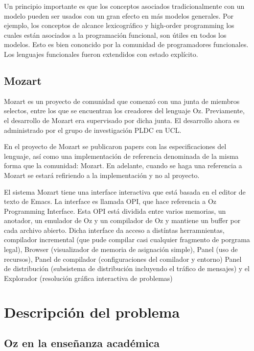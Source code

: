 \documentclass[a4paper,11pt]{article}
\begin{document}
Un principio importante es que los conceptos asociados tradicionalmente con un modelo pueden ser usados con un gran efecto en más modelos generales. Por ejemplo, los conceptos de alcance lexicográfico y high-order programming los cuales están asociados a la programación funcional, son útiles en todos los modelos. Esto es bien cononcido por la comunidad de programadores funcionales. Los lenguajes funcionales fueron extendidos con estado explícito.


\subsection{Mozart}

Mozart es un proyecto de comunidad que comenzó con una junta de miembros selectos, entre los que se encuentran los creadores del lenguaje Oz. Previamente, el desarrollo de Mozart era supervisado por dicha junta. El desarrollo ahora es administrado por el grupo de investigación PLDC en UCL.

En el proyecto de Mozart se publicaron papers con las especificaciones del lenguaje, así como una implementación de referencia denominada de la misma forma que la comunidad: Mozart. En adelante, cuando se haga una referencia a Mozart se estará refiriendo a la implementación y no al proyecto.

El sistema Mozart tiene una interface interactiva que está basada en el editor de texto de Emacs. La interface es llamada OPI, que hace referencia a Oz Programming Interface. Esta OPI está dividida entre varios memorias, un anotador, un emulador de Oz y un compilador de Oz y mantiene un buffer por cada archivo abierto. Dicha interface da acceso a distíntas herramnientas, compilador incremental (que pude compilar casi cualquier fragmento de porgrama legal), Browser (visualizador de memoria de asignación simple), Panel (uso de recursos), Panel de compilador (configuraciones del comilador y entorno) Panel de distribución (subsistema de distribución incluyendo el tráfico de mensajes) y el Explorador (resolución gráfica interactiva de problemas)

\section{Descripción del problema}

\subsection{Oz en la enseñanza académica}
\end{document}
